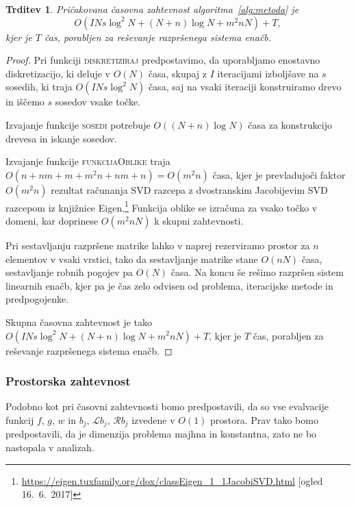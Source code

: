 \documentclass[12pt,a4paper,twoside]{article}
\theoremstyle{definition} %
\theoremstyle{plain} %
\newtheorem{trditev}[definicija]{Trditev}
\numberwithin{equation}{section}
\newcommand{\Rc}{\mathcal{R}}
\renewcommand{\L}{\mathcal{L}}
\begin{document}
\begin{trditev}
  Pričakovana časovna zahtevnost algoritma~\ref{alg:metoda} je
  \begin{equation}
    O(I N s \log^2 N + (N+n)\log N + m^2n N) + T,
    \label{eq:casovna-zahtevnost}
  \end{equation}
  kjer je $T$ čas, porabljen za reševanje razpršenega sistema enačb.
\end{trditev}
\begin{proof}
Pri funkciji \textsc{diskretiziraj} predpostavimo, da uporabljamo enostavno
diskretizacijo, ki deluje v $O(N)$ časa, skupaj z $I$ iteracijami izboljšave
na $s$ sosedih, ki traja $O(I N s \log^2 N)$ časa, saj na vsaki iteraciji
konstruiramo drevo in iščemo $s$ sosedov vsake točke.

Izvajanje funkcije \textsc{sosedi} potrebuje $O((N+n) \log N)$ časa za konstrukcijo
drevesa in iskanje sosedov.

Izvajanje funkcije \textsc{funkcijaOblike} traja $O(n + nm + m + m^2n + nm +
n) = O(m^2n)$ časa, kjer je prevladujoči faktor $O(m^2 n)$ rezultat računanja SVD
razcepa z dvostranskim Jacobijevim SVD razcepom iz knjižnice
Eigen.\footnote{\url{https://eigen.tuxfamily.org/dox/classEigen_1_1JacobiSVD.html}
[ogled 16.\ 6.\ 2017]} Funkcija oblike se izračuna za vsako točko v domeni,
kar doprinese $O(m^2 n N)$ k skupni zahtevnosti.

Pri sestavljanju razpršene matrike lahko v naprej rezerviramo prostor za $n$
elementov v vsaki vrstici, tako da sestavljanje matrike stane $O(nN)$ časa,
sestavljanje robnih pogojev pa $O(N)$ časa. Na koncu še rešimo razpršen sistem
linearnih enačb, kjer pa je čas zelo odvisen od problema, iteracijske metode in
predpogojenke.

Skupna časovna zahtevnost je tako $O(I N s \log^2 N + (N+n)\log N + m^2n N) + T$,
kjer je $T$ čas, porabljen za reševanje razpršenega sistema enačb.
\end{proof}

\subsubsection{Prostorska zahtevnost}
Podobno kot pri časovni zahtevnosti bomo predpostavili, da so vse evalvacije funkcij $f$, $g$, $w$
in $b_j$, $\L b_j$, $\Rc b_j$ izvedene v $O(1)$ prostora. Prav tako bomo predpostavili, da je
dimenzija problema majhna in konstantna, zato ne bo nastopala v analizah.
\end{document}
